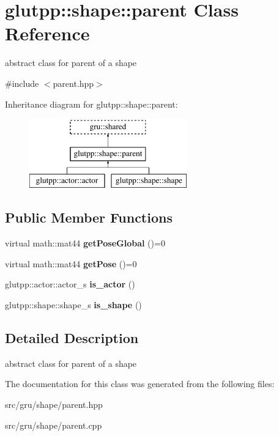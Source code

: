 \hypertarget{classglutpp_1_1shape_1_1parent}{\section{glutpp\-:\-:shape\-:\-:parent \-Class \-Reference}
\label{classglutpp_1_1shape_1_1parent}
}


abstract class for parent of a shape  




{\ttfamily \#include $<$parent.\-hpp$>$}

\-Inheritance diagram for glutpp\-:\-:shape\-:\-:parent\-:\begin{figure}[H]
\begin{center}
\leavevmode
\includegraphics[height=3.000000cm]{classglutpp_1_1shape_1_1parent}
\end{center}
\end{figure}
\subsection*{\-Public \-Member \-Functions}
\begin{DoxyCompactItemize}
\item 
\hypertarget{classglutpp_1_1shape_1_1parent_a03e51f41b32afe34a21e63c38de5c0e9}{virtual math\-::mat44 {\bfseries get\-Pose\-Global} ()=0}\label{classglutpp_1_1shape_1_1parent_a03e51f41b32afe34a21e63c38de5c0e9}

\item 
\hypertarget{classglutpp_1_1shape_1_1parent_a8a7966c644061e1c87da2d539443fa16}{virtual math\-::mat44 {\bfseries get\-Pose} ()=0}\label{classglutpp_1_1shape_1_1parent_a8a7966c644061e1c87da2d539443fa16}

\item 
\hypertarget{classglutpp_1_1shape_1_1parent_a3751fcc84d5337c607204b2e1d3efc2f}{glutpp\-::actor\-::actor\-\_\-s {\bfseries is\-\_\-actor} ()}\label{classglutpp_1_1shape_1_1parent_a3751fcc84d5337c607204b2e1d3efc2f}

\item 
\hypertarget{classglutpp_1_1shape_1_1parent_aa56920af8e7e92cd4a8557abe9cc6e4a}{glutpp\-::shape\-::shape\-\_\-s {\bfseries is\-\_\-shape} ()}\label{classglutpp_1_1shape_1_1parent_aa56920af8e7e92cd4a8557abe9cc6e4a}

\end{DoxyCompactItemize}


\subsection{\-Detailed \-Description}
abstract class for parent of a shape 

\-The documentation for this class was generated from the following files\-:\begin{DoxyCompactItemize}
\item 
src/gru/shape/parent.\-hpp\item 
src/gru/shape/parent.\-cpp\end{DoxyCompactItemize}
